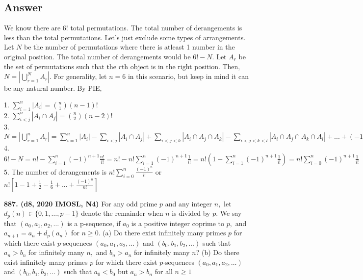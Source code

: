 \documentclass{article}
\begin{document}
\subsection{Answer}
We know there are $6!$ total permutations. The total
number of derangements is less than the total permutations.
Let's just exclude some types of arrangements. Let $N$ be
the number of permutations where there is atleast 1 number
in the original position. The total number of derangements
would be $6! - N$. Let $A_r$ be the set of permutations
such that the $r$th object is in the right position. Then,
$N = |\bigcup\limits_{r=1}^{N}A_r|$. For generality, let $n=6$ in
this scenario, but keep in mind it can be any natural number. By PIE,\\
\begin{center}
    \begin{large}
        1. $\sum\limits_{i=1}^{n}{|A_i|} = \binom{n}{1}(n-1)!$\\
        2.  $\sum\limits_{i<j}^{n}{|A_i \cap A_j|} = \binom{n}{2}(n-2)!$\\
        3. $N = |\bigcup\limits_{r=1}^{n}A_r|
            = \sum\limits_{i=1}^{n}{|A_i|}
            - \sum\limits_{i<j}{|A_i \cap A_j|}
            + \sum\limits_{i<j<k}{|A_i \cap A_j \cap A_k|}
            - \sum\limits_{i<j<k<l}
            {|A_i\cap{A_j}\cap{A_k}\cap{A_l}|} + ...
            + (-1)^{n+1}|A_1 \cap A_2 \cap ... \cap A_n|
            = \sum\limits_{i=1}^{n}{\binom{n}{i}(-1)^{n+1}
            (n-i)!}=\sum\limits_{i=1}^{n}{(-1)^{n+1}\frac{n!}{i!}}$\\
        4. $6! - N = n! - \sum\limits_{i=1}^{n}{(-1)^{n+1}\frac{n!}{i!}}
            = n! - n!\sum\limits_{i=1}^{n}{(-1)^{n+1}\frac{1}{i!}}
            = n!(1-\sum\limits_{i=1}^{n}{(-1)^{n+1}\frac{1}{i!}})
            = n!\sum\limits_{i=0}^{n}{(-1)^{n+1}\frac{1}{i!}}$\\
        5. The number of derangements is
        $\boxed{n!\sum\limits_{i=0}^{n}{\frac{(-1)^{n}}{i!}}}$ or
        $\boxed{n![1-1+\frac{1}{2}-\frac{1}{6}+...+\frac{(-1)^n}{n!}]}$
    \end{large}
\end{center}
\textbf{887. (\color{red}d8\color{black}, 2020 IMOSL, N4)} For any odd prime $p$ and any integer $n,$ let $d_p (n) \in \{ 0,1, \dots, p-1 \}$ denote the remainder when $n$ is divided by $p.$ We say that $(a_0, a_1, a_2, \dots)$ is a p-sequence, if $a_0$ is a positive integer coprime to $p,$ and
$a_{n+1} =a_n + d_p (a_n)$ for $n \geq 0$.
\smallbreak
(a) Do there exist infinitely many primes $p$ for which there exist $p$-sequences $(a_0, a_1, a_2, \dots)$ and $(b_0, b_1, b_2, \dots)$ such that $a_n >b_n$ for infinitely many $n,$ and $b_n > a_n$ for infinitely many $n$?
\smallbreak
(b) Do there exist infinitely many primes $p$ for which there exist $p$-sequences $(a_0, a_1, a_2, \dots)$ and $(b_0, b_1, b_2, \dots)$ such that
$a_0 < b_0$ but $a_n > b_n$ for all $n \geqslant 1$
\end{document}
